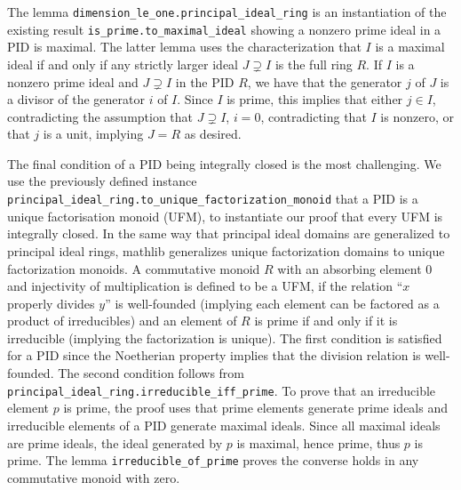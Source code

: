 \documentclass[a4paper,USenglish,cleveref, autoref, thm-restate]{lipics-v2021}
\newcommand{\lean}[1]{\texttt{#1}\xspace} %
\newcommand{\mathlib}{\textsf{mathlib}\xspace}
\begin{document}
The lemma \lean{dimension\_le\_one.principal\_ideal\_ring} is an instantiation of the existing result \lean{is\_prime.to\_maximal\_ideal} showing a nonzero prime ideal in a PID is maximal.
The latter lemma uses the characterization that $I$ is a maximal ideal if and only if any strictly larger ideal $J\supsetneq I$ is the full ring $R$.
If $I$ is a nonzero prime ideal and $J \supsetneq I$ in the PID $R$, we have that the generator $j$ of $J$ is a divisor of the generator $i$ of $I$. Since $I$ is prime, this implies that either $j \in I$, contradicting the assumption that $J \supsetneq I$, $i = 0$, contradicting that $I$ is nonzero, or that $j$ is a unit, implying $J = R$ as desired.

The final condition of a PID being integrally closed is the most challenging.
We use the previously defined instance \lean{principal\_ideal\_ring.to\_unique\_factorization\_monoid} that a PID is a unique factorisation monoid (UFM),
to instantiate our proof that every UFM is integrally closed.
In the same way that principal ideal domains are generalized to principal ideal rings, \mathlib generalizes unique factorization domains to unique factorization monoids.
A commutative monoid $R$ with an absorbing element $0$ and injectivity of multiplication is defined to be a UFM,
if the relation ``$x$ properly divides $y$'' is well-founded (implying each element can be factored as a product of irreducibles) and
an element of $R$ is prime if and only if it is irreducible (implying the factorization is unique).
The first condition is satisfied for a PID since the Noetherian property implies that the division relation is well-founded.
The second condition follows from \lean{principal\_ideal\_ring.irreducible\_iff\_prime}.
To prove that an irreducible element $p$ is prime, the proof uses that prime elements generate prime ideals and irreducible elements of a PID generate maximal ideals. Since all maximal ideals are prime ideals, the ideal generated by $p$ is maximal, hence prime, thus $p$ is prime.
The lemma \lean{irreducible\_of\_prime} proves the converse holds in any commutative monoid with zero.
\end{document}
